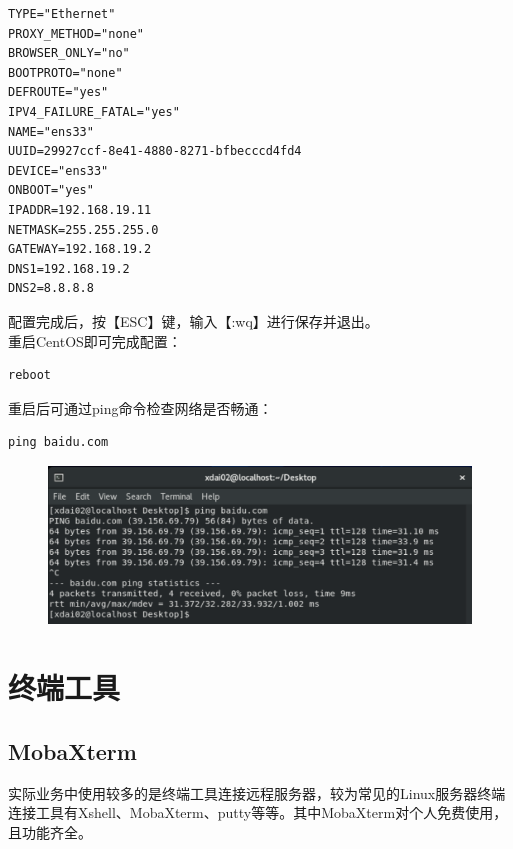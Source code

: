 \documentclass[12pt, openany, oneside]{book}
\begin{document}
\begin{lstlisting}
TYPE="Ethernet"
PROXY_METHOD="none"
BROWSER_ONLY="no"
BOOTPROTO="none"
DEFROUTE="yes"
IPV4_FAILURE_FATAL="yes"
NAME="ens33"
UUID=29927ccf-8e41-4880-8271-bfbecccd4fd4
DEVICE="ens33"
ONBOOT="yes"
IPADDR=192.168.19.11
NETMASK=255.255.255.0
GATEWAY=192.168.19.2
DNS1=192.168.19.2
DNS2=8.8.8.8
\end{lstlisting}

配置完成后，按【ESC】键，输入【:wq】进行保存并退出。\\

重启CentOS即可完成配置：

\vspace{-0.5cm}

\begin{lstlisting}
reboot
\end{lstlisting}

重启后可通过ping命令检查网络是否畅通：

\vspace{-0.5cm}

\begin{lstlisting}
ping baidu.com
\end{lstlisting}

\begin{figure}[H]
    \centering
    \includegraphics[scale=0.6]{img/C1/1-4/11.png}
\end{figure}

\newpage

\section{终端工具}

\subsection{MobaXterm}

实际业务中使用较多的是终端工具连接远程服务器，较为常见的Linux服务器终端连接工具有Xshell、MobaXterm、putty等等。其中MobaXterm对个人免费使用，且功能齐全。\\
\end{document}
